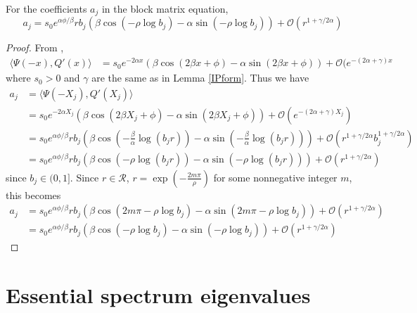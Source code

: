 \documentclass[thesis.tex]{subfiles}
\begin{document}
\begin{lemma}\label{lemma:ajparam}
For the coefficients $a_j$ in the block matrix equation, 
\begin{equation}\label{ajparam}
a_j = s_0 e^{\alpha \phi/\beta} r b_j \left( \beta \cos\left(-\rho \log b_j \right) - \alpha \sin \left(-\rho \log b_j \right) \right) + \mathcal{O}(r^{1+\gamma/2\alpha})
\end{equation}

\begin{proof}
From \cite[Lemma 6.1]{Sandstede1998},
\begin{align*}\label{IPpsiQprime}
\langle \Psi(-x), Q'(x) \rangle
&= s_0 e^{-2 \alpha x}\left( \beta \cos(2 \beta x + \phi) - \alpha \sin(2 \beta x + \phi)\right) + \mathcal{O}(e^{-(2 \alpha + \gamma) x}
\end{align*}
where $s_0 > 0$ and $\gamma$ are the same as in Lemma \ref{IPform}. Thus we have
\begin{align*}
a_j &= \langle \Psi(-X_j), Q'(X_j) \rangle \\
&= s_0 e^{-2 \alpha X_j}\left( \beta \cos(2 \beta X_j + \phi) - \alpha \sin(2 \beta X_j + \phi)\right) + \mathcal{O}(e^{-(2 \alpha + \gamma) X_j}) \\
&= s_0 e^{\alpha \phi/\beta} r b_j \left( \beta \cos\left( -\frac{\beta}{\alpha} \log(b_j r) \right) - \alpha \sin \left( -\frac{\beta}{\alpha} \log(b_j r) \right) \right) + \mathcal{O}(r^{1+\gamma/2\alpha} b_j^{1 + \gamma/2\alpha}) \\
&= s_0 e^{\alpha \phi/\beta} r b_j \left( \beta \cos\left( -\rho \log(b_j r) \right) - \alpha \sin \left( -\rho \log(b_j r) \right) \right) + \mathcal{O}(r^{1+\gamma/2\alpha})
\end{align*}
since $b_j \in (0, 1]$. Since $r \in \mathcal{R}$, $r = \exp\left(-\frac{2 m \pi}{\rho}\right)$ for some nonnegative integer $m$, this becomes 
\begin{align*}
a_j &= s_0 e^{\alpha \phi/\beta} r b_j \left( \beta \cos\left( 2 m \pi -\rho \log b_j \right) - \alpha \sin \left( 2 m \pi -\rho \log b_j \right) \right) + \mathcal{O}(r^{1+\gamma/2\alpha}) \\
&= s_0 e^{\alpha \phi/\beta} r b_j \left( \beta \cos\left(-\rho \log b_j \right) - \alpha \sin \left(-\rho \log b_j \right) \right) + \mathcal{O}(r^{1+\gamma/2\alpha})
\end{align*}
\end{proof}
\end{lemma}

\section{Essential spectrum eigenvalues}
\end{document}
